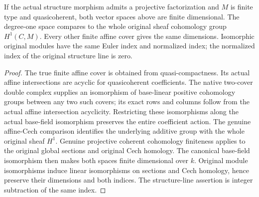 \begin{theorem}
\label{thm:fc-scheme-coherent-euler-index}
\leanok
{}
If the actual structure morphism admits a projective factorization and
$M$ is finite type and quasicoherent, both vector spaces above are
finite dimensional. The degree-one space compares to the whole
original sheaf cohomology group $H^1(C,M)$. Every other finite affine
cover gives the same dimensions. Isomorphic original modules have
the same Euler index and normalized index; the normalized index of
the original structure line is zero.
\end{theorem}
\begin{proof}
The true finite affine cover is obtained from quasi-compactness. Its
actual affine intersections are acyclic for quasicoherent coefficients.
The native two-cover double complex supplies an isomorphism of
base-linear positive cohomology groups between any two such covers;
its exact rows and columns follow from the actual affine intersection
acyclicity. Restricting these isomorphisms along the actual base-field
isomorphism preserves the entire coefficient action. The genuine
affine-Cech comparison identifies the underlying additive group with
the whole original sheaf $H^1$. Genuine projective coherent cohomology
finiteness applies to the original global sections and original
Cech homology. The canonical base-field isomorphism then makes both
spaces finite dimensional over $k$. Original module isomorphisms
induce linear isomorphisms on sections and Cech homology, hence preserve
their dimensions and both indices. The structure-line assertion is
integer subtraction of the same index.
\end{proof}

